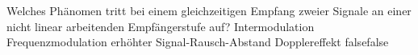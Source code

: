     {Welches Phänomen tritt bei einem gleichzeitigen Empfang zweier Signale an einer nicht linear arbeitenden Empfängerstufe auf?}
    {Intermodulation}
    {Frequenzmodulation}
    {erhöhter Signal-Rausch-Abstand}
    {Dopplereffekt }
    {false}{false}